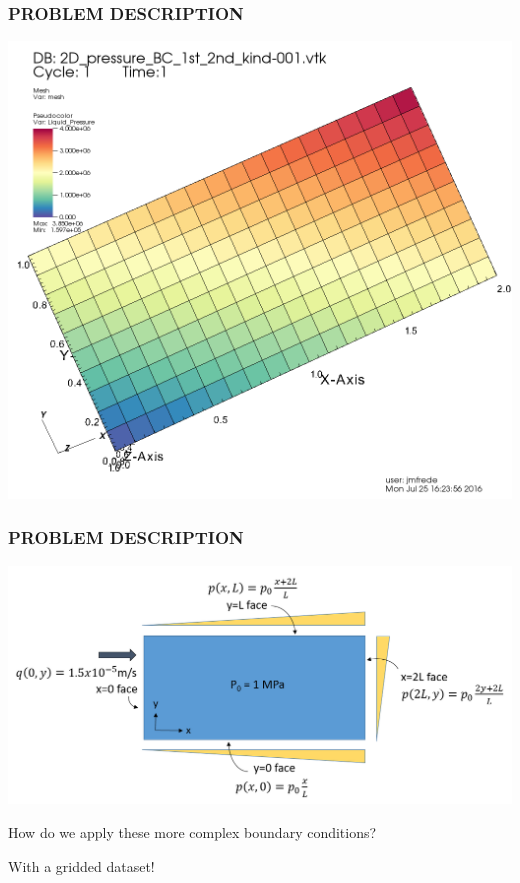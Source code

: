 \documentclass{beamer}
\begin{document}
\begin{frame}\frametitle{PROBLEM DESCRIPTION}

\includegraphics[width=0.75\textheight]{./visit_figure.png}

\end{frame}

\begin{frame}\frametitle{PROBLEM DESCRIPTION}

\includegraphics[width=1.2\textheight]{./BC_schematic.png}

How do we apply these more complex boundary conditions? 

With a gridded dataset!

\end{frame}
\end{document}
